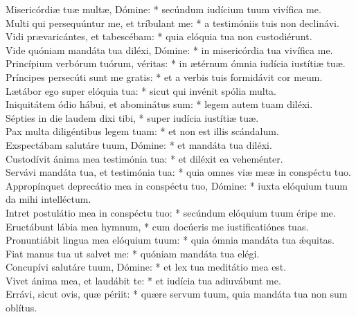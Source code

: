 {	Misericórdiæ tuæ multæ, Dómine: * secúndum iudícium tuum vivífica me. \\
	Multi qui persequúntur me, et tríbulant me: * a testimóniis tuis non declinávi. \\
	Vidi prævaricántes, et tabescébam: * quia elóquia tua non custodiérunt. \\
	Vide quóniam mandáta tua diléxi, Dómine: * in misericórdia tua vivífica me. \\
	Princípium verbórum tuórum, véritas: * in ætérnum ómnia iudícia iustítiæ tuæ. \\
	Príncipes persecúti sunt me gratis: * et a verbis tuis formidávit cor meum. \\
	Lætábor ego super elóquia tua: * sicut qui invénit spólia multa. \\
	Iniquitátem ódio hábui, et abominátus sum: * legem autem tuam diléxi. \\
	Sépties in die laudem dixi tibi, * super iudícia iustítiæ tuæ. \\
	Pax multa diligéntibus legem tuam: * et non est illis scándalum. \\
	Exspectábam salutáre tuum, Dómine: * et mandáta tua diléxi. \\
	Custodívit ánima mea testimónia tua: * et diléxit ea veheménter. \\
	Servávi mandáta tua, et testimónia tua: * quia omnes viæ meæ in conspéctu tuo. \\
	Appropínquet deprecátio mea in conspéctu tuo, Dómine: * iuxta elóquium tuum da mihi intelléctum. \\
	Intret postulátio mea in conspéctu tuo: * secúndum elóquium tuum éripe me. \\
	Eructábunt lábia mea hymnum, * cum docúeris me iustificatiónes tuas. \\
	Pronuntiábit lingua mea elóquium tuum: * quia ómnia mandáta tua ǽquitas. \\
	Fiat manus tua ut salvet me: * quóniam mandáta tua elégi. \\
	Concupívi salutáre tuum, Dómine: * et lex tua meditátio mea est. \\
	Vivet ánima mea, et laudábit te: * et iudícia tua adiuvábunt me. \\
	Errávi, sicut ovis, quæ périit: * quære servum tuum, quia mandáta tua non sum oblítus.
}

